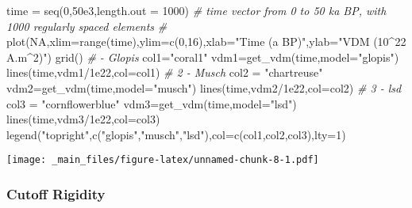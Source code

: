 \documentclass[
]{book}
\newenvironment{Shaded}{\begin{snugshade}}{\end{snugshade}}
\newcommand{\AttributeTok}[1]{\textcolor[rgb]{0.77,0.63,0.00}{#1}}
\newcommand{\CommentTok}[1]{\textcolor[rgb]{0.56,0.35,0.01}{\textit{#1}}}
\newcommand{\ConstantTok}[1]{\textcolor[rgb]{0.00,0.00,0.00}{#1}}
\newcommand{\DecValTok}[1]{\textcolor[rgb]{0.00,0.00,0.81}{#1}}
\newcommand{\FloatTok}[1]{\textcolor[rgb]{0.00,0.00,0.81}{#1}}
\newcommand{\FunctionTok}[1]{\textcolor[rgb]{0.00,0.00,0.00}{#1}}
\newcommand{\NormalTok}[1]{#1}
\newcommand{\OtherTok}[1]{\textcolor[rgb]{0.56,0.35,0.01}{#1}}
\newcommand{\SpecialCharTok}[1]{\textcolor[rgb]{0.00,0.00,0.00}{#1}}
\newcommand{\StringTok}[1]{\textcolor[rgb]{0.31,0.60,0.02}{#1}}
\begin{document}
\begin{Shaded}
\begin{Highlighting}[]
\NormalTok{time }\OtherTok{=} \FunctionTok{seq}\NormalTok{(}\DecValTok{0}\NormalTok{,}\FloatTok{50e3}\NormalTok{,}\AttributeTok{length.out =} \DecValTok{1000}\NormalTok{) }\CommentTok{\# time vector from 0 to 50 ka BP, with 1000 regularly spaced elements}
\CommentTok{\#}
\FunctionTok{plot}\NormalTok{(}\ConstantTok{NA}\NormalTok{,}\AttributeTok{xlim=}\FunctionTok{range}\NormalTok{(time),}\AttributeTok{ylim=}\FunctionTok{c}\NormalTok{(}\DecValTok{0}\NormalTok{,}\DecValTok{16}\NormalTok{),}\AttributeTok{xlab=}\StringTok{"Time (a BP)"}\NormalTok{,}\AttributeTok{ylab=}\StringTok{"VDM (10\^{}22 A.m\^{}2)"}\NormalTok{)}
\FunctionTok{grid}\NormalTok{()}
\CommentTok{\# {-} Glopis}
\NormalTok{col1}\OtherTok{=}\StringTok{"coral1"}
\NormalTok{vdm1}\OtherTok{=}\FunctionTok{get\_vdm}\NormalTok{(time,}\AttributeTok{model=}\StringTok{"glopis"}\NormalTok{)}
\FunctionTok{lines}\NormalTok{(time,vdm1}\SpecialCharTok{/}\FloatTok{1e22}\NormalTok{,}\AttributeTok{col=}\NormalTok{col1)}
\CommentTok{\# 2 {-} Musch}
\NormalTok{col2 }\OtherTok{=} \StringTok{"chartreuse"}
\NormalTok{vdm2}\OtherTok{=}\FunctionTok{get\_vdm}\NormalTok{(time,}\AttributeTok{model=}\StringTok{"musch"}\NormalTok{)}
\FunctionTok{lines}\NormalTok{(time,vdm2}\SpecialCharTok{/}\FloatTok{1e22}\NormalTok{,}\AttributeTok{col=}\NormalTok{col2)}
\CommentTok{\# 3 {-} lsd}
\NormalTok{col3 }\OtherTok{=} \StringTok{"cornflowerblue"}
\NormalTok{vdm3}\OtherTok{=}\FunctionTok{get\_vdm}\NormalTok{(time,}\AttributeTok{model=}\StringTok{"lsd"}\NormalTok{)}
\FunctionTok{lines}\NormalTok{(time,vdm3}\SpecialCharTok{/}\FloatTok{1e22}\NormalTok{,}\AttributeTok{col=}\NormalTok{col3)}
\FunctionTok{legend}\NormalTok{(}\StringTok{"topright"}\NormalTok{,}\FunctionTok{c}\NormalTok{(}\StringTok{"glopis"}\NormalTok{,}\StringTok{"musch"}\NormalTok{,}\StringTok{"lsd"}\NormalTok{),}\AttributeTok{col=}\FunctionTok{c}\NormalTok{(col1,col2,col3),}\AttributeTok{lty=}\DecValTok{1}\NormalTok{)}
\end{Highlighting}
\end{Shaded}

\texttt{[image: \_main\_files/figure-latex/unnamed-chunk-8-1.pdf]}

\hypertarget{cutoff-rigidity}{%
\subsubsection{Cutoff Rigidity}\label{cutoff-rigidity}}
\end{document}

